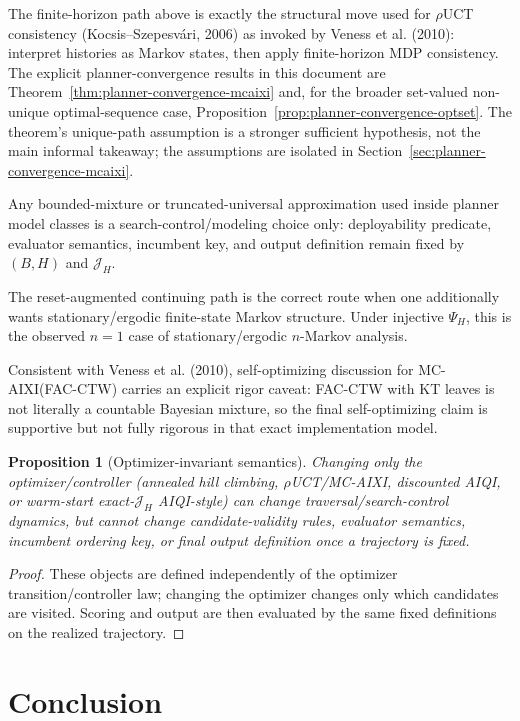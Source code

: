 \documentclass[11pt]{article}
\newtheorem{proposition}{Proposition}
\begin{document}
The finite-horizon path above is exactly the structural move used for
$\rho$UCT consistency (Kocsis--Szepesv\'ari, 2006) as invoked by Veness et al.
(2010): interpret histories as Markov states, then apply finite-horizon MDP
consistency.
The explicit planner-convergence results in this document are
Theorem~\ref{thm:planner-convergence-mcaixi} and, for the broader set-valued
non-unique optimal-sequence case,
Proposition~\ref{prop:planner-convergence-optset}. The theorem's unique-path
assumption is a stronger sufficient hypothesis, not the main informal
takeaway; the assumptions are isolated in
Section~\ref{sec:planner-convergence-mcaixi}.

Any bounded-mixture or truncated-universal approximation used inside planner
model classes is a search-control/modeling choice only: deployability
predicate, evaluator semantics, incumbent key, and output definition remain
fixed by $(B,H)$ and $\mathcal{J}_H$.

The reset-augmented continuing path is the correct route when one additionally
wants stationary/ergodic finite-state Markov structure. Under injective
$\Psi_H$, this is the observed $n=1$ case of stationary/ergodic $n$-Markov
analysis.

Consistent with Veness et al. (2010), self-optimizing discussion for
MC-AIXI(FAC-CTW) carries an explicit rigor caveat: FAC-CTW with KT leaves is
not literally a countable Bayesian mixture, so the final self-optimizing claim
is supportive but not fully rigorous in that exact implementation model.

\begin{proposition}[Optimizer-invariant semantics]
Changing only the optimizer/controller (annealed hill climbing,
$\rho$UCT/MC-AIXI, discounted AIQI, or warm-start exact-$\mathcal{J}_H$
AIQI-style) can change traversal/search-control dynamics, but
cannot change candidate-validity rules, evaluator semantics, incumbent ordering
key, or final output definition once a trajectory is fixed.
\end{proposition}

\begin{proof}
These objects are defined independently of the optimizer transition/controller
law; changing the optimizer changes only which candidates are visited.
Scoring and output are then evaluated by the same fixed definitions on the
realized trajectory.
\end{proof}

\section{Conclusion}\label{sec:conclusion}
\end{document}

